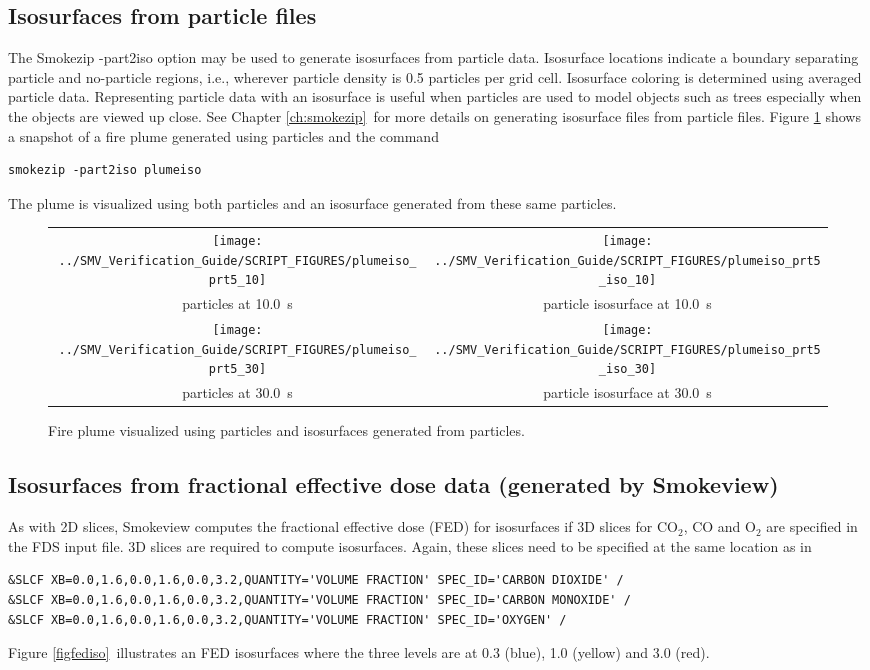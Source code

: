 \documentclass[11pt,twoside]{book}
\begin{document}
\subsection{Isosurfaces from particle files}
The Smokezip -part2iso option may be used to generate isosurfaces from particle data.
Isosurface locations indicate a boundary separating particle and
no-particle regions, i.e., wherever particle density is 0.5
particles per grid cell.  Isosurface  coloring is determined using
averaged particle data.  Representing particle data with an
isosurface is useful when particles are used to model objects such
as trees especially when the objects are viewed up close.  See
Chapter \ref{ch:smokezip}\ for more details on generating
isosurface files from particle files.  Figure \ref{figisoparticle}
shows a snapshot of a fire plume generated using particles and the command
\begin{lstlisting}
smokezip -part2iso plumeiso
\end{lstlisting}
The plume is visualized using both particles and an isosurface
generated from these same particles.


\begin{figure}[bph]
\begin{center}
\begin{tabular}{cc}
\texttt{[image: ../SMV\_Verification\_Guide/SCRIPT\_FIGURES/plumeiso\_prt5\_10]}&
\texttt{[image: ../SMV\_Verification\_Guide/SCRIPT\_FIGURES/plumeiso\_prt5\_iso\_10]}\\
particles at 10.0~s&particle isosurface at 10.0~s\\
\texttt{[image: ../SMV\_Verification\_Guide/SCRIPT\_FIGURES/plumeiso\_prt5\_30]}&
\texttt{[image: ../SMV\_Verification\_Guide/SCRIPT\_FIGURES/plumeiso\_prt5\_iso\_30]}\\
particles at 30.0~s&particle isosurface at 30.0~s\\
\end{tabular}
\end{center}
\caption{Fire plume visualized using particles and isosurfaces
generated from  particles.}
\label{figisoparticle}%
\end{figure}

\subsection{Isosurfaces from fractional effective dose data (generated by Smokeview)}
As with 2D slices, Smokeview computes the fractional effective dose (FED) for isosurfaces
if 3D slices for $\mathrm{CO_2}$, CO and $\mathrm{O_2}$ are
specified in the FDS input file.  3D slices are required to compute isosurfaces.
Again, these slices need to be specified at the
same location as in
\begin{lstlisting}
&SLCF XB=0.0,1.6,0.0,1.6,0.0,3.2,QUANTITY='VOLUME FRACTION' SPEC_ID='CARBON DIOXIDE' /
&SLCF XB=0.0,1.6,0.0,1.6,0.0,3.2,QUANTITY='VOLUME FRACTION' SPEC_ID='CARBON MONOXIDE' /
&SLCF XB=0.0,1.6,0.0,1.6,0.0,3.2,QUANTITY='VOLUME FRACTION' SPEC_ID='OXYGEN' /
\end{lstlisting}
Figure \ref{figfediso}\ illustrates
an FED isosurfaces where the three levels are at 0.3 (blue), 1.0 (yellow) and 3.0 (red).
\end{document}
